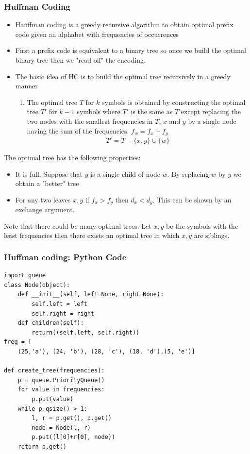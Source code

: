 \documentclass{beamer}
\begin{document}
  \begin{frame}
    \frametitle{Huffman Coding}
    \begin{itemize}
    \item Hauffman coding is a greedy recursive algorithm to obtain optimal prefix code given an alphabet with frequencies of occurrences
 \end{itemize}
\end{frame}
\begin{frame}
\begin{itemize}
   \item First a prefix code is equivalent to a binary tree so once we build the optimal  binary tree then we "read off" the encoding.
  \item  The basic idea of HC is to build the optimal tree recursively in a greedy manner
    \begin{enumerate}
    \item The optimal tree $T$ for $k$ symbols is obtained by constructing the optimal tree $T'$ for $k-1$ symbols where $T'$ is the same as $T$ except replacing the 
two nodes with the smallest frequencies in $T$, $x$ and $y$ by a single node having the sum of the frequencies: $f_w=f_x+f_y$
\begin{align*}
  T'=T-\{x,y\}\cup\{w\}
\end{align*}
    \end{enumerate}
    \end{itemize}
  \end{frame}
\begin{frame}
  The optimal tree has the following properties:
  \begin{itemize}
    \item It is full. Suppose that $y$ is a single child of node $w$. By replacing $w$ by $y$ we obtain a "better" tree
    \item For any two leaves $x,y$ if $f_x> f_y$ then $d_x<d_y$. This can be shown by an exchange argument.
  \end{itemize}
  Note that there could be many optimal trees. Let $x,y$ be the symbols with the least frequencies then there exists an optimal tree in which $x,y$ are siblings.
\end{frame}
  \begin{frame}[fragile]
  \frametitle{Huffman coding: Python Code}
\begin{lstlisting}[numbers=none]
import queue
class Node(object):
    def __init__(self, left=None, right=None):
        self.left = left
        self.right = right
    def children(self):
        return((self.left, self.right))
freq = [
    (25,'a'), (24, 'b'), (28, 'c'), (18, 'd'),(5, 'e')]

def create_tree(frequencies):
    p = queue.PriorityQueue()
    for value in frequencies:    
        p.put(value)             
    while p.qsize() > 1:         
        l, r = p.get(), p.get()  
        node = Node(l, r) 
        p.put((l[0]+r[0], node)) 
    return p.get()               
\end{lstlisting}
\end{frame}
\end{document}
